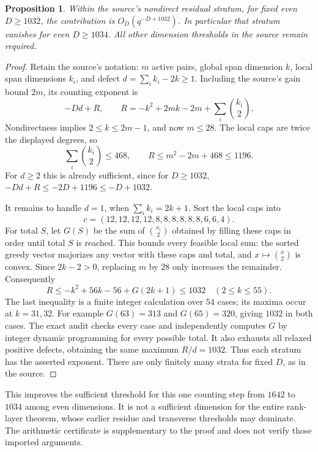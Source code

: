 \documentclass[11pt]{article}
\newtheorem{proposition}{Proposition}
\begin{document}
\begin{proposition}\label{prop:residual-1032}
Within the source's nondirect residual stratum, for fixed even
$D\ge1032$, the contribution is $O_D(q^{-D+1032})$.
In particular that stratum vanishes for even $D\ge1034$.
All other dimension thresholds in the source remain required.
\end{proposition}
\begin{proof}
Retain the source's notation: $m$ active pairs, global span dimension $k$,
local span dimensions $k_i$, and defect
$d=\sum_i k_i-2k\ge1$. Including the source's gain bound $2m$, its
counting exponent is
\[
 -Dd+R,\qquad
 R=-k^2+2mk-2m+\sum_i\binom{k_i}{2}.
\]
Nondirectness implies $2\le k\le2m-1$, and now $m\le28$.
The local caps are twice the displayed degrees, so
\[
 \sum_i\binom{k_i}{2}\le468,\qquad
 R\le m^2-2m+468\le1196.
\]
For $d\ge2$ this is already sufficient, since for $D\ge1032$,
$-Dd+R\le-2D+1196\le-D+1032$.

It remains to handle $d=1$, when $\sum_i k_i=2k+1$.
Sort the local caps into
\[
 c=(12,12,12,12,8,8,8,8,8,8,6,6,4).
\]
For total $S$, let $G(S)$ be the sum of $\binom{x_i}{2}$ obtained by
filling these caps in order until total $S$ is reached. This bounds every
feasible local sum: the sorted greedy vector majorizes any vector with
these caps and total, and $x\mapsto\binom{x}{2}$ is convex.
Since $2k-2>0$, replacing $m$ by $28$ only increases the remainder.
Consequently
\[
 R\le-k^2+56k-56+G(2k+1)\le1032
 \quad(2\le k\le55).
\]
The last inequality is a finite integer calculation over $54$ cases;
its maxima occur at $k=31,32$. For example $G(63)=313$ and $G(65)=320$,
giving $1032$ in both cases. The exact audit checks every case and
independently computes $G$ by integer dynamic programming for every
possible total. It also exhausts all relaxed positive defects, obtaining
the same maximum $R/d=1032$. Thus each stratum has the asserted exponent.
There are only finitely many strata for fixed $D$, as in the source.
\end{proof}

This improves the sufficient threshold for this one counting step from
$1642$ to $1034$ among even dimensions. It is not a sufficient dimension
for the entire rank-layer theorem, whose earlier residue and transverse
thresholds may dominate. The arithmetic certificate is supplementary to
the proof and does not verify those imported arguments.
\end{document}
